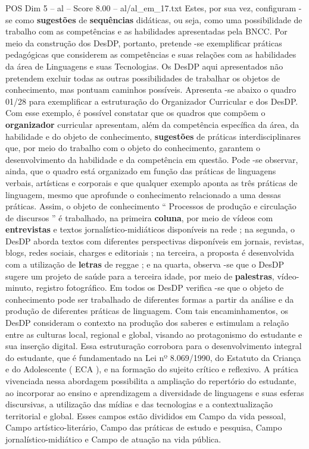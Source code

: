 \begin{textsample}{POS Dim 5 – al – Score 8.00 – al/al\_em\_17.txt}
Estes, por sua vez, configuram -se como \textbf{sugestões} de \textbf{sequências} didáticas, ou seja, como uma possibilidade de trabalho com as competências e as habilidades apresentadas pela BNCC.
Por meio da construção dos DesDP, portanto, pretende -se exemplificar práticas pedagógicas que considerem as competências e suas relações com as habilidades da área de Linguagens e suas Tecnologias.
Os DesDP aqui apresentados não pretendem excluir todas as outras possibilidades de trabalhar os objetos de conhecimento, mas pontuam caminhos possíveis.
Apresenta -se abaixo o quadro 01/28 para exemplificar a estruturação do Organizador Curricular e dos DesDP.
Com esse exemplo, é possível constatar que os quadros que compõem o \textbf{organizador} curricular apresentam, além da competência específica da área, da habilidade e do objeto de conhecimento, \textbf{sugestões} de práticas interdisciplinares que, por meio do trabalho com o objeto do conhecimento, garantem o desenvolvimento da habilidade e da competência em questão.
Pode -se observar, ainda, que o quadro está organizado em função das práticas de linguagens verbais, artísticas e corporais e que qualquer exemplo aponta as três práticas de linguagem, mesmo que aprofunde o conhecimento relacionado a uma dessas práticas.
Assim, o objeto de conhecimento “ Processos de produção e circulação de discursos ” é trabalhado, na primeira \textbf{coluna}, por meio de vídeos com \textbf{entrevistas} e textos jornalístico-midiáticos disponíveis na rede ; na segunda, o DesDP aborda textos com diferentes perspectivas disponíveis em jornais, revistas, blogs, redes sociais, charges e editoriais ; na terceira, a proposta é desenvolvida com a utilização de \textbf{letras} de reggae ; e na quarta, observa -se que o DesDP sugere um projeto de saúde para a terceira idade, por meio de \textbf{palestras}, vídeo-minuto, registro fotográfico.
Em todos os DesDP verifica -se que o objeto de conhecimento pode ser trabalhado de diferentes formas a partir da análise e da produção de diferentes práticas de linguagem.
Com tais encaminhamentos, os DesDP consideram o contexto na produção dos saberes e estimulam a relação entre as culturas local, regional e global, visando ao protagonismo do estudante e sua inserção digital.
Essa estruturação corrobora para o desenvolvimento integral do estudante, que é fundamentado na Lei nº 8.069/1990, do Estatuto da Criança e do Adolescente ( ECA ), e na formação do sujeito crítico e reflexivo.
A prática vivenciada nessa abordagem possibilita a ampliação do repertório do estudante, ao incorporar ao ensino e aprendizagem a diversidade de linguagens e suas esferas discursivas, a utilização das mídias e das tecnologias e a contextualização territorial e global.
Esses campos estão divididos em Campo da vida pessoal, Campo artístico-literário, Campo das práticas de estudo e pesquisa, Campo jornalístico-midiático e Campo de atuação na vida pública.

\end{textsample}

